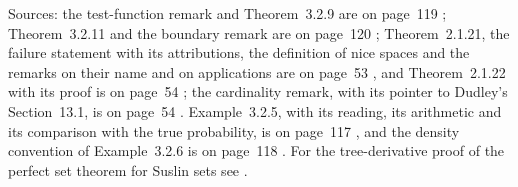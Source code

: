 Sources: the test-function remark and Theorem~3.2.9 are on page~119
\cite[p.~119]{DurrettPTEAuthor2019}; Theorem~3.2.11 and the boundary remark are
on page~120 \cite[p.~120]{DurrettPTEAuthor2019}; Theorem~2.1.21, the
failure statement with its attributions, the definition of nice spaces
and the remarks on their name and on applications are on page~53
\cite[p.~53]{DurrettPTEAuthor2019}, and Theorem~2.1.22 with its proof is
on page~54 \cite[Theorem~2.1.22, p.~54]{DurrettPTEAuthor2019}; the cardinality
remark, with its pointer to Dudley's Section~13.1, is on page~54
\cite[p.~54]{DurrettPTEAuthor2019}. Example~3.2.5, with its reading, its arithmetic and its
comparison with the true probability, is on page~117
\cite[Example~3.2.5, p.~117]{DurrettPTEAuthor2019}, and the density
convention of Example~3.2.6 is on page~118
\cite[p.~118]{DurrettPTEAuthor2019}. For the tree-derivative proof of the
perfect set theorem for Suslin sets see
\cite[2C.2, pp.~59--61]{Moschovakis2009DSTAuthor}.
